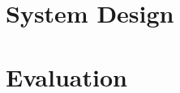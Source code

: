 \documentclass{acm_proc_article-sp}
\begin{document}
\section{System Design}
\label{sec_system}

\section{Evaluation}
\label{sec_eval}

\end{document}
